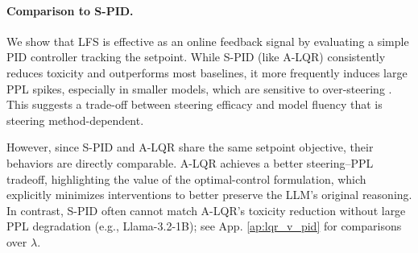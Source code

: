 \documentclass{article}
\theoremstyle{plain}
\theoremstyle{definition}
\theoremstyle{remark}
\begin{document}
\paragraph{Comparison to S-PID.} We show that LFS is effective as an online feedback signal by evaluating a simple PID controller tracking the setpoint. While S-PID (like A-LQR) consistently reduces toxicity and outperforms most baselines, it more frequently induces large PPL spikes, especially in smaller models, which are sensitive to over-steering \cite{Vogels_Wong_Choho_Blangero_Bhan_2025}. This suggests a trade-off between steering efficacy and model fluency that is steering method-dependent.

However, since S-PID and A-LQR share the same setpoint objective, their behaviors are directly comparable. A-LQR achieves a better steering–PPL tradeoff, highlighting the value of the optimal-control formulation, which explicitly minimizes interventions to better preserve the LLM's original reasoning.
In contrast, S-PID often cannot match A-LQR’s toxicity reduction without large PPL degradation (e.g., Llama-3.2-1B); see App. \ref{ap:lqr_v_pid} for comparisons over $\lambda$.
\end{document}
